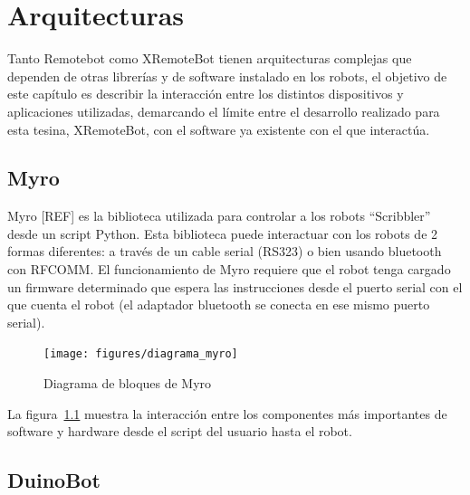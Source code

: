 \chapter{Arquitecturas}\label{ch2}



Tanto Remotebot como XRemoteBot tienen arquitecturas complejas que
dependen de otras librerías y de software instalado en los robots,
el objetivo de este capítulo es describir la interacción entre los
distintos dispositivos y aplicaciones utilizadas, demarcando el límite
entre el desarrollo realizado para esta tesina, XRemoteBot, con el software ya
existente con el que interactúa.

\section{Myro}\label{ch2:myro}

Myro [REF] es la biblioteca utilizada para controlar a los robots ``Scribbler''
desde un script Python. Esta biblioteca puede interactuar con los robots de 2
formas diferentes: a través de un cable serial (RS323) o bien usando bluetooth
con RFCOMM. El funcionamiento de Myro requiere que el robot tenga
cargado un firmware determinado que espera las instrucciones desde el puerto
serial con el que cuenta el robot (el adaptador bluetooth se conecta en ese
mismo puerto serial).

\begin{figure}
    \centering
    \texttt{[image: figures/diagrama\_myro]}
    \caption{Diagrama de bloques de Myro}
    \label{fig:diagrama_myro}
\end{figure}

La figura~\ref{fig:diagrama_myro} muestra la interacción entre los componentes
más importantes de software y hardware desde el script del usuario hasta el
robot.

\section{DuinoBot}\label{ch2:duinobot}

